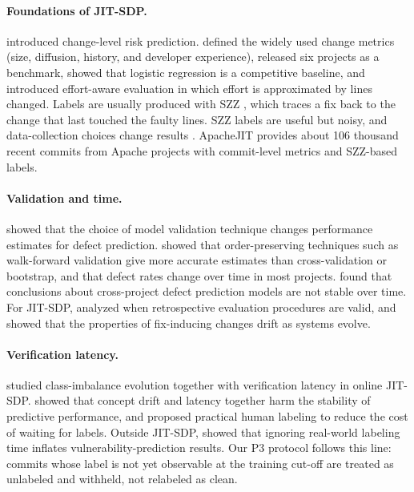\paragraph{Foundations of JIT-SDP.}
\citet{mockus2000} introduced change-level risk prediction. \citet{kamei2013} defined the widely used change metrics (size, diffusion, history, and developer experience), released six projects as a benchmark, showed that logistic regression is a competitive baseline, and introduced effort-aware evaluation in which effort is approximated by lines changed. Labels are usually produced with SZZ \citep{sliwerski2005}, which traces a fix back to the change that last touched the faulty lines. SZZ labels are useful but noisy, and data-collection choices change results \citep{herbold2022}. ApacheJIT \citep{keshavarz2022} provides about 106 thousand recent commits from Apache projects with commit-level metrics and SZZ-based labels.

\paragraph{Validation and time.}
\citet{tantithamthavorn2017} showed that the choice of model validation technique changes performance estimates for defect prediction. \citet{falessi2020} showed that order-preserving techniques such as walk-forward validation give more accurate estimates than cross-validation or bootstrap, and that defect rates change over time in most projects. \citet{bangash2020} found that conclusions about cross-project defect prediction models are not stable over time. For JIT-SDP, \citet{song2023a} analyzed when retrospective evaluation procedures are valid, and \citet{mcintosh2018} showed that the properties of fix-inducing changes drift as systems evolve.

\paragraph{Verification latency.}
\citet{cabral2019} studied class-imbalance evolution together with verification latency in online JIT-SDP. \citet{cabral2022} showed that concept drift and latency together harm the stability of predictive performance, and \citet{song2023b} proposed practical human labeling to reduce the cost of waiting for labels. Outside JIT-SDP, \citet{jimenez2019} showed that ignoring real-world labeling time inflates vulnerability-prediction results. Our P3 protocol follows this line: commits whose label is not yet observable at the training cut-off are treated as unlabeled and withheld, not relabeled as clean.

